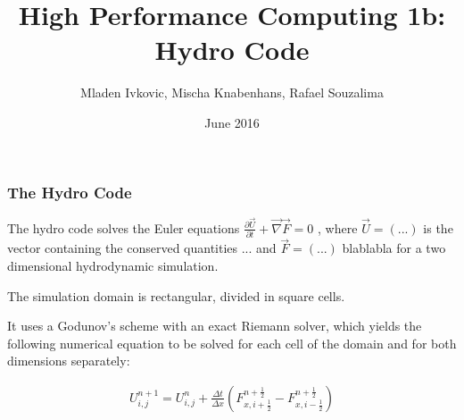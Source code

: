 \documentclass[9pt]{beamer}
\title{High Performance Computing 1b: Hydro Code}
\author{
	Mladen Ivkovic, Mischa Knabenhans, Rafael Souzalima
}
\date{June 2016}
\begin{document}
% 
% 
% 
% 
% 


\begin{frame}{}
	\titlepage
\end{frame}


\begin{frame}
	\frametitle{The Hydro Code}
	
	The hydro code solves the Euler equations $\displaystyle \frac{\partial \vec{U}}{\partial t} + \vec{\nabla} \vec{F} = 0 $ , where $\vec{U} = (...) $ is the vector containing the conserved quantities ... and $\vec{F} = (...)$  blablabla for a two dimensional hydrodynamic simulation.
	
	The simulation domain is rectangular, divided in square cells.
	
	It uses a Godunov's scheme with an exact Riemann solver, which yields the following numerical equation to be solved for each cell of the domain and for both dimensions separately:
	
	\begin{align*}
		U^{n+1}_{i,j} = U^n_{i,j} + \frac{\Delta t}{\Delta x} \left( F^{n + \frac{1}{2}}_{x, i + \frac{1}{2}} -  F^{n + \frac{1}{2}}_{x, i - \frac{1}{2}}\right)
	\end{align*}
\end{frame}
\end{document}

